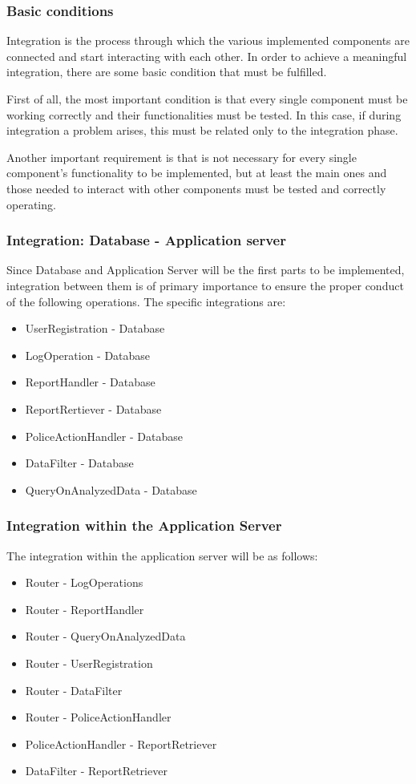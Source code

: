 \subsubsection{Basic conditions}
Integration is the process through which the various implemented components are connected and start interacting with each other.
In order to achieve a meaningful integration, there are some basic condition that must be fulfilled. \par
First of all, the most important condition is that every single component must be working correctly and their functionalities must be tested. In this case, if during integration a problem arises, this must be related only to the integration phase. \par
Another important requirement is that is not necessary for every single component's functionality to be implemented, but at least the main ones and those needed to interact with other components must be tested and correctly operating.

\subsubsection{Integration: Database - Application server}
Since Database and Application Server will be the first parts to be implemented, integration between them is of primary importance to ensure the proper conduct of the following operations.
The specific integrations are:
\begin{itemize}
	\item UserRegistration - Database
	\item LogOperation - Database
	\item ReportHandler - Database
	\item ReportRertiever - Database
	\item PoliceActionHandler - Database
	\item DataFilter - Database
	\item QueryOnAnalyzedData - Database
\end{itemize}
\subsubsection{Integration within the Application Server}
The integration within the application server will be as follows:
\begin{itemize}
	\item Router - LogOperations
	\item Router - ReportHandler
	\item Router - QueryOnAnalyzedData
	\item Router - UserRegistration
	\item Router - DataFilter
	\item Router - PoliceActionHandler
	\item PoliceActionHandler - ReportRetriever
	\item DataFilter - ReportRetriever
\end{itemize}

